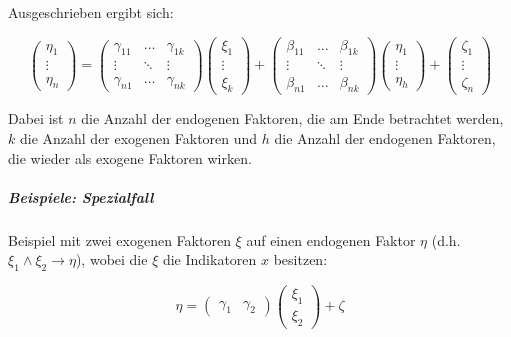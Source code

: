 \documentclass{article}
\numberwithin{equation}{section}
\begin{document}
Ausgeschrieben ergibt sich:

\begin{equation}
\begin{pmatrix}\eta_1\\ \vdots\\ \eta_n\end{pmatrix} = 
\begin{pmatrix}\gamma_{11} & \hdots & \gamma_{1k}\\ \vdots & \ddots & \vdots \\ \gamma_{n1} & \hdots & \gamma_{nk} \end{pmatrix}
\begin{pmatrix}\xi_1\\ \vdots\\ \xi_k\end{pmatrix} +
\begin{pmatrix}\beta_{11} & \hdots & \beta_{1k}\\ \vdots & \ddots & \vdots \\ \beta_{n1} & \hdots & \beta_{nk} \end{pmatrix}
\begin{pmatrix}\eta_1\\ \vdots\\ \eta_h\end{pmatrix} +
\begin{pmatrix}\zeta_1\\ \vdots\\ \zeta_n\end{pmatrix}
\end{equation}

Dabei ist $n$ die Anzahl der endogenen Faktoren, die am Ende betrachtet werden, $k$ die Anzahl der exogenen Faktoren und $h$ die Anzahl der endogenen Faktoren, die wieder als exogene Faktoren wirken.

\subparagraph{Beispiele: Spezialfall}

Beispiel mit zwei exogenen Faktoren $\xi$ auf einen endogenen Faktor $\eta$ (d.h. $\xi_1 \wedge \xi_2 \to \eta$), wobei die $\xi$ die Indikatoren $x$ besitzen:

\begin{equation}
\eta = \begin{pmatrix}\gamma_1 & \gamma_2\end{pmatrix} \begin{pmatrix}\xi_1\\ \xi_2\end{pmatrix} + \zeta
\end{equation}
\end{document}

